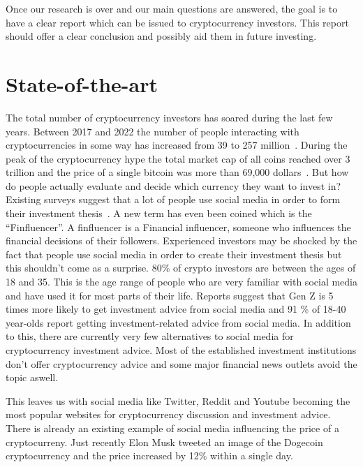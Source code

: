 \noindent Once our research is over and our main questions are answered, the goal is to have a clear report which can be issued to cryptocurrency investors. This report should offer a clear conclusion and possibly aid them in future investing. 



\section{State-of-the-art}%
\label{sec:state-of-the-art}

\noindent The total number of cryptocurrency investors has soared during the last few years. Between 2017 and 2022 the number of people interacting with cryptocurrencies in some way has increased from 39 to 257 million~\autocite{Statista}. During the peak of the cryptocurrency hype the total market cap of all coins reached over 3 trillion and the price of a single bitcoin was more than 69,000 dollars~\autocite{Coingecko}. But how do people actually evaluate and decide which currency they want to invest in? Existing surveys suggest that a lot of people use social media in order to form their investment thesis~\autocite{Graffeo2021}. A new term has even been coined which is the ``Finfluencer''. A finfluencer is a Financial influencer, someone who influences the financial decisions of their followers\autocite{Words2021}. Experienced investors may be shocked by the fact that people use social media in order to create their investment thesis but this shouldn't come as a surprise.  80\% of crypto investors are between the ages of 18 and 35\autocite{Statista2022}. This is the age range of people who are very familiar with social media and have used it for most parts of their life. Reports suggest that Gen Z is 5 times more likely to get investment advice from social media and 91 \% of 18-40 year-olds report getting investment-related advice from social media\autocite{Purnell2022}. In addition to this, there are currently very few alternatives to social media for cryptocurrency investment advice. Most of the established investment institutions don't offer cryptocurrency advice and some major financial news outlets avoid the topic aswell.


\noindent This leaves us with social media like Twitter, Reddit and Youtube becoming the most popular websites for cryptocurrency discussion and investment advice. There is already an existing example of social media influencing the price of a cryptocurreny. Just recently Elon Musk tweeted an image of the Dogecoin cryptocurrency and the price increased by 12\% within a single day\autocite{Saul2022}.


